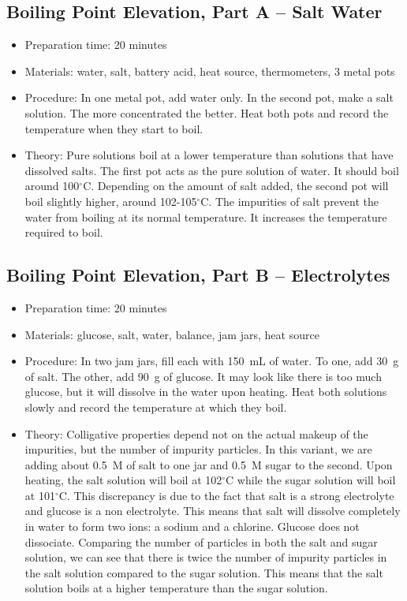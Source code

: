 \subsection{Boiling Point Elevation, Part A -- Salt Water}
\begin{itemize}
\item{Preparation time: 20 minutes}
\item{Materials: water, salt, battery acid, heat source, thermometers, 3 metal pots}
\item{Procedure: In one metal pot, add water only. In the second pot, make a salt solution. The more concentrated the better. Heat both pots and record the temperature when they start to boil.}
\item{Theory: Pure solutions boil at a lower temperature than solutions that have dissolved salts. The first pot acts as the pure solution of water. It should boil around 100$^\circ$C. Depending on the amount of salt added, the second pot will boil slightly higher, around 102-105$^\circ$C. The impurities of salt prevent the water from boiling at its normal temperature. It increases the temperature required to boil.}
\end{itemize}

\subsection{Boiling Point Elevation, Part B -- Electrolytes}
\begin{itemize}
\item{Preparation time: 20 minutes}
\item{Materials: glucose, salt, water, balance, jam jars, heat source}
\item{Procedure: In two jam jars, fill each with 150~mL of water. To one, add 30~g of salt. The other, add 90~g of glucose. It may look like there is too much glucose, but it will dissolve in the water upon heating. Heat both solutions slowly and record the temperature at which they boil.}
\item{Theory: Colligative properties depend not on the actual makeup of the impurities, but the number of impurity particles. In this variant, we are adding about 0.5~M of salt to one jar and 0.5~M sugar to the second. Upon heating, the salt solution will boil at 102$^\circ$C while the sugar solution will boil at 101$^\circ$C. This discrepancy is due to the fact that salt is a strong electrolyte and glucose is a non electrolyte. This means that salt will dissolve completely in water to form two ions: a sodium and a chlorine. Glucose does not dissociate. Comparing the number of particles in both the salt and sugar solution, we can see that there is twice the number of impurity particles in the salt solution compared to the sugar solution. This means that the salt solution boils at a higher temperature than the sugar solution.}
\end{itemize}


